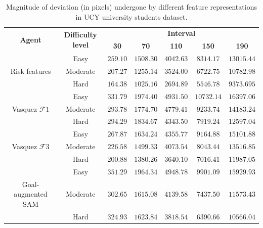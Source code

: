 \begin{table}[htbp]
	\begin{center}
		\renewcommand{\arraystretch}{1.3}
		\begin{tabular}{|c|c|c|c|c|c|c|}
			\hline
			\multicolumn{1}{|c|}{\multirow{2}{*}{\textbf{Agent}}} & \multicolumn{1}{c|}{\multirow{2}{*}{\textbf{Difficulty level}}}  & \multicolumn{5}{c|}{\multirow{1}{*}{\textbf{Interval}}}\\ \cline{3-7}
			
			&& \textbf{30} & \textbf{70} & \textbf{110} & \textbf{150}  &  \textbf{190} \\
			\hline
								& Easy & $259.10$ & $1508.30$ & $4042.63$ & $8314.17$ & $13015.44$ \\ \cline{2-7}
			Risk features & Moderate & $207.27$ & $1255.14$ & $3524.00$ & $6722.75$ & $10782.98$ \\ \cline{2-7}
								& Hard & $164.38$ & $1025.16$ & $2694.89$ & $5546.78$ & $9373.695$ \\
			\hline
											& Easy & $331.79$ & $1974.40$ & $4931.50$ & $10732.14$ & $16397.06$ \\ \cline{2-7}
			Vasquez $\mathcal{F}1$ & Moderate & $293.78$ & $1774.70$ & $4779.41$ & $9233.74$ & $14183.24$ \\ \cline{2-7}
											& Hard & $294.29$ & $1834.67$ & $4343.50$ & $7919.24$ & $12597.04$ \\
			\hline
			 								& Easy & $267.87$ & $1634.24$ & $4355.77$ & $9164.88$ & $15101.88$ \\ \cline{2-7}
			Vasquez $\mathcal{F}3$ & Moderate & $226.58$ & $1499.33$ & $4073.54$ & $8043.44$ & $13516.85$ \\ \cline{2-7}
											& Hard & $200.88$ & $1380.26$ & $3640.10$ & $7016.41$ & $11987.05$ \\
			\hline			
		 							 	& Easy & $351.29$ & $1964.34$ & $4948.78$ & $9901.09$ & $15929.93$ \\ \cline{2-7}
			Goal-augmented SAM & Moderate & $302.65$ & $1615.08$ & $4139.58$ & $7437.50$ & $11573.43$ \\ \cline{2-7}
										& Hard & $324.93$ & $1623.84$ & $3818.54$ & $6390.66$ & $10566.04$ \\
			\hline
		\end{tabular}
	\end{center}
	\caption{Magnitude of deviation (in pixels) undergone by different feature representations in UCY university students dataset.}
	\label{tab:ucy_inter_irl_drift_results}
\end{table}


